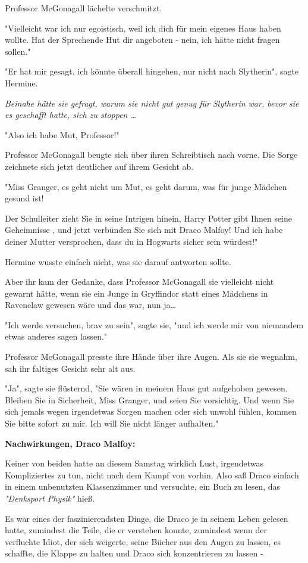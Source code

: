 {Professor McGonagall lächelte verschmitzt.

"Vielleicht war ich nur egoistisch, weil ich dich für mein eigenes Haus haben wollte. Hat der Sprechende Hut dir angeboten - nein, ich hätte nicht fragen sollen."

"Er hat mir gesagt, ich könnte überall hingehen, nur nicht nach Slytherin", sagte Hermine.

\emph{Beinahe hätte sie gefragt, warum sie nicht gut genug für Slytherin war, bevor sie es geschafft hatte, sich zu stoppen …}

"Also ich habe Mut, Professor!"

Professor McGonagall beugte sich über ihren Schreibtisch nach vorne. Die Sorge zeichnete sich jetzt deutlicher auf ihrem Gesicht ab.

"Miss Granger, es geht nicht um Mut, es geht darum, was für junge Mädchen gesund ist!

Der Schulleiter zieht Sie in seine Intrigen hinein, Harry Potter gibt Ihnen seine Geheimnisse , und jetzt verbünden Sie sich mit Draco Malfoy! Und ich habe deiner Mutter versprochen, dass du in Hogwarts sicher sein würdest!"

Hermine wusste einfach nicht, was sie darauf antworten sollte.

Aber ihr kam der Gedanke, dass Professor McGonagall sie vielleicht nicht gewarnt hätte, wenn sie ein Junge in Gryffindor statt eines Mädchens in Ravenclaw gewesen wäre und das war, nun ja…

"Ich werde versuchen, brav zu sein", sagte sie, "und ich werde mir von niemandem etwas anderes sagen lassen."

Professor McGonagall presste ihre Hände über ihre Augen. Als sie sie wegnahm, sah ihr faltiges Gesicht sehr alt aus.

"Ja", sagte sie flüsternd, "Sie wären in meinem Haus gut aufgehoben gewesen. Bleiben Sie in Sicherheit, Miss Granger, und seien Sie vorsichtig. Und wenn Sie sich jemals wegen irgendetwas Sorgen machen oder sich unwohl fühlen, kommen Sie bitte sofort zu mir. Ich will Sie nicht länger aufhalten."

\textbf{Nachwirkungen, Draco Malfoy:}

Keiner von beiden hatte an diesem Samstag wirklich Lust, irgendetwas Kompliziertes zu tun, nicht nach dem Kampf von vorhin. Also saß Draco einfach in einem unbenutzten Klassenzimmer und versuchte, ein Buch zu lesen, das \emph{"Denksport Physik"} hieß.

Es war eines der faszinierendsten Dinge, die Draco je in seinem Leben gelesen hatte, zumindest die Teile, die er verstehen konnte, zumindest wenn der verfluchte Idiot, der sich weigerte, seine Bücher aus den Augen zu lassen, es schaffte, die Klappe zu halten und Draco sich konzentrieren zu lassen -

}

